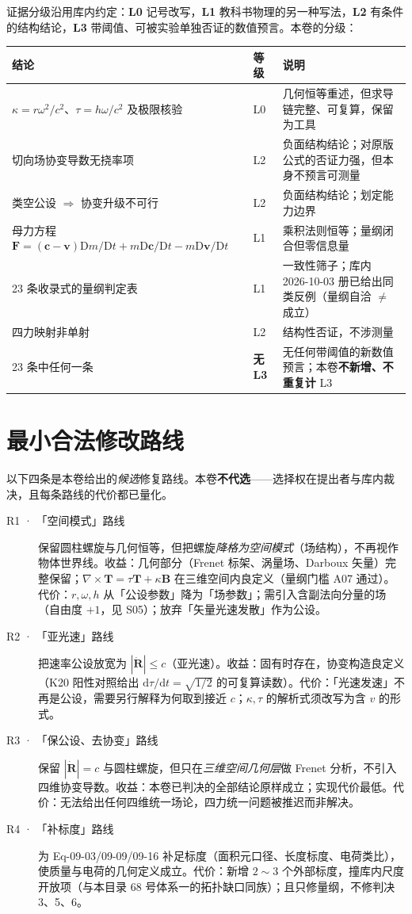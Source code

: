 \documentclass[UTF8,fontset=fandol,11pt]{ctexart}
\newcommand{\dd}{\mathrm{d}}
\newcommand{\DD}{\mathrm{D}}
\newcommand{\bx}{\boldsymbol}
\begin{document}
证据分级沿用库内约定：\textbf{L0} 记号改写，\textbf{L1} 教科书物理的另一种写法，\textbf{L2} 有条件的结构结论，\textbf{L3} 带阈值、可被实验单独否证的数值预言。本卷的分级：

\begin{center}
\begin{tabular}{p{3.2cm}p{1.6cm}p{9.0cm}}
\toprule
结论 & 等级 & 说明 \\
\midrule
$\kappa=r\omega^2/c^2$、$\tau=h\omega/c^2$ 及极限核验 & L0 & 几何恒等重述，但求导链完整、可复算，保留为工具 \\
切向场协变导数无挠率项 & L2 & 负面结构结论；对原版公式的否证力强，但本身不预言可测量 \\
类空公设 $\Rightarrow$ 协变升级不可行 & L2 & 负面结构结论；划定能力边界 \\
母力方程 $\bx F=(\bx c-\bx v)\DD m/\DD t+m\DD\bx c/\DD t-m\DD\bx v/\DD t$ & L1 & 乘积法则恒等；量纲闭合但零信息量 \\
23 条收录式的量纲判定表 & L1 & 一致性筛子；库内 2026-10-03 册已给出同类反例（量纲自洽 $\ne$ 成立） \\
四力映射非单射 & L2 & 结构性否证，不涉测量 \\
23 条中任何一条 & \textbf{无 L3} & 无任何带阈值的新数值预言；本卷\textbf{不新增、不重复计} L3 \\
\bottomrule
\end{tabular}
\end{center}

\section{最小合法修改路线}
\label{sec:routes}

以下四条是本卷给出的\textit{候选}修复路线。本卷\textbf{不代选}——选择权在提出者与库内裁决，且每条路线的代价都已量化。

\begin{description}
  \item[R1 · 「空间模式」路线] 保留圆柱螺旋与几何恒等，但把螺旋\emph{降格为空间模式}（场结构），不再视作物体世界线。收益：几何部分（Frenet 标架、涡量场、Darboux 矢量）完整保留；$\nabla\times\bx T=\tau\bx T+\kappa\bx B$ 在三维空间内良定义（量纲门槛 A07 通过）。代价：$r,\omega,h$ 从「公设参数」降为「场参数」；需引入含副法向分量的场（自由度 $+1$，见 S05）；放弃「矢量光速发散」作为公设。
  \item[R2 · 「亚光速」路线] 把速率公设放宽为 $|\dot{\bx R}|\le c$（亚光速）。收益：固有时存在，协变构造良定义（K20 阳性对照给出 $\dd\tau/\dd t=\sqrt{1/2}$ 的可复算读数）。代价：「光速发速」不再是公设，需要另行解释为何取到接近 $c$；$\kappa,\tau$ 的解析式须改写为含 $v$ 的形式。
  \item[R3 · 「保公设、去协变」路线] 保留 $|\dot{\bx R}|=c$ 与圆柱螺旋，但只在\emph{三维空间几何层}做 Frenet 分析，不引入四维协变导数。收益：本卷已判决的全部结论原样成立；实现代价最低。代价：无法给出任何四维统一场论，四力统一问题被推迟而非解决。
  \item[R4 · 「补标度」路线] 为 Eq-09-03/09-09/09-16 补足标度（面积元口径、长度标度、电荷类比），使质量与电荷的几何定义成立。代价：新增 $2\sim3$ 个外部标度，撞库内尺度开放项（与本目录 68 号体系一的拓扑缺口同族）；且只修量纲，不修判决 3、5、6。
\end{description}
\end{document}
